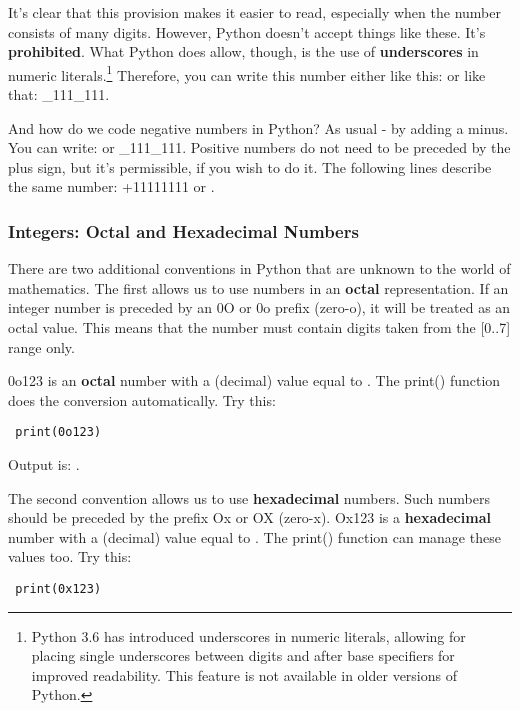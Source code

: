 \documentclass[a4paper,10pt]{article}
\begin{document}
It's clear that this provision makes it easier to read, especially when the number consists of many digits. However, Python doesn't accept things like these. It's \textbf{prohibited}. What Python does allow, though, is the use of \textbf{underscores} in numeric literals.\footnote{Python 3.6 has introduced underscores in numeric literals, allowing for placing single underscores between digits and after base specifiers for improved readability. This feature is not available in older versions of Python.} Therefore, you can write this number either like this: {} or like that: {\_111\_111}.
\newline

And how do we code negative numbers in Python? As usual - by adding a minus. You can write: {} or {\_111\_111}. Positive numbers do not need to be preceded by the plus sign, but it's permissible, if you wish to do it. The following lines describe the same number: {\selectfont +11111111} or {}.
\newline

\subsubsection{Integers: Octal and Hexadecimal Numbers}
There are two additional conventions in Python that are unknown to the world of mathematics. The first allows us to use numbers in an \textbf{octal} representation. If an integer number is preceded by an {\selectfont 0O} or {\selectfont 0o} prefix (zero-o), it will be treated as an octal value. This means that the number must contain digits taken from the [0..7] range only.
\newline

{\selectfont 0o123} is an \textbf{octal} number with a (decimal) value equal to {}. The {\selectfont print()} function does the conversion automatically. Try this:
\begin{verbatim}
 print(0o123)
\end{verbatim}

Output is: {}.
\newline

The second convention allows us to use \textbf{hexadecimal} numbers. Such numbers should be preceded by the prefix {\selectfont Ox} or {\selectfont OX} (zero-x). {\selectfont Ox123} is a \textbf{hexadecimal} number with a (decimal) value equal to {}. The {\selectfont print()} function can manage these values too. Try this:
\begin{verbatim}
 print(0x123)
\end{verbatim}
\end{document}
